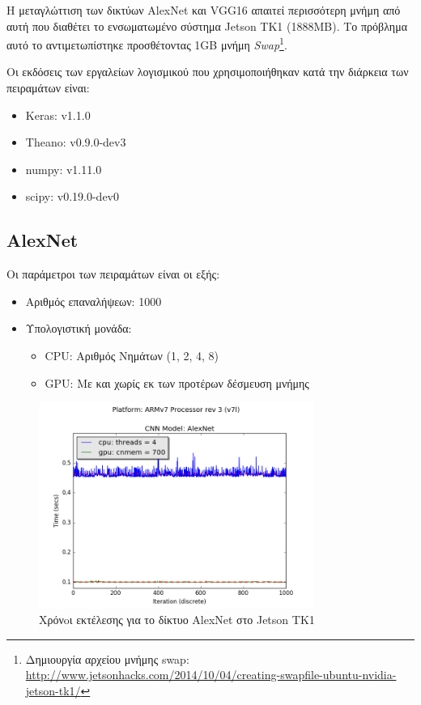 Η μεταγλώττιση των δικτύων AlexNet και VGG16 απαιτεί περισσότερη
μνήμη από αυτή που διαθέτει το ενσωματωμένο σύστημα Jetson TK1 (1888MB).
Το πρόβλημα αυτό το αντιμετωπίστηκε προσθέτοντας 1GB μνήμη
\emph{Swap}\footnote{Δημιουργία αρχείου μνήμης swap: \url{http://www.jetsonhacks.com/2014/10/04/creating-swapfile-ubuntu-nvidia-jetson-tk1/}}.

Οι εκδόσεις των εργαλείων λογισμικού που χρησιμοποιήθηκαν
κατά την διάρκεια των πειραμάτων είναι:
\begin{itemize}
  \item{Keras: v1.1.0}
  \item{Theano: v0.9.0-dev3}
  \item{numpy: v1.11.0}
  \item{scipy: v0.19.0-dev0}
\end{itemize}


\subsection{AlexNet}

Οι παράμετροι των πειραμάτων είναι οι εξής:
\begin{itemize}
  \item{Αριθμός επαναλήψεων: 1000}
  \item{Υπολογιστική μονάδα:}
    \begin{itemize}
      \item{CPU: Αριθμός Νημάτων (1, 2, 4, 8)}
      \item{GPU: Με και χωρίς εκ των προτέρων δέσμευση μνήμης}
    \end{itemize}
\end{itemize}

\begin{figure}[H]
  \centering
  \includegraphics[width=0.8\textwidth]{./images/chapter6/benchmark_alexnet_jetson.png}
  \caption[Χρόνoι εκτέλεσης για το δίκτυο AlexNet στο Jetson TK1]{Χρόνoι εκτέλεσης για το δίκτυο AlexNet στο Jetson TK1}
  \label{fig:alexnet_results_jetson}
\end{figure}

